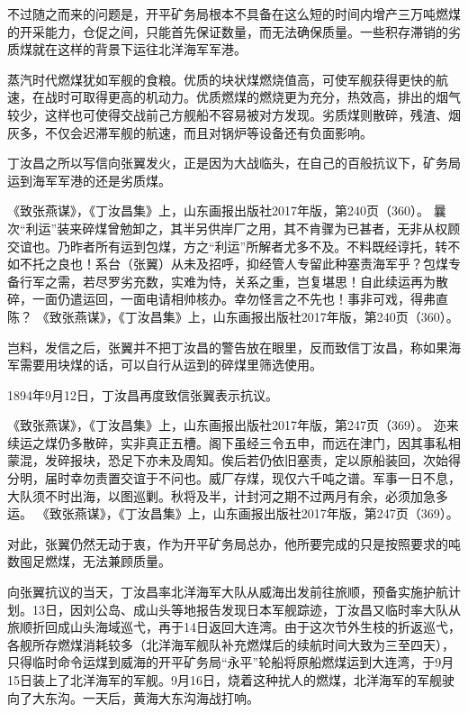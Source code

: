 \documentclass[12pt,UTF8]{ctexbook}
\begin{document}
不过随之而来的问题是，开平矿务局根本不具备在这么短的时间内增产三万吨燃煤的开采能力，仓促之间，只能首先保证数量，而无法确保质量。一些积存滞销的劣质煤就在这样的背景下运往北洋海军军港。

蒸汽时代燃煤犹如军舰的食粮。优质的块状煤燃烧值高，可使军舰获得更快的航速，在战时可取得更高的机动力。优质燃煤的燃烧更为充分，热效高，排出的烟气较少，这样也可使得交战前己方舰船不容易被对方发现。劣质煤则散碎，残渣、烟灰多，不仅会迟滞军舰的航速，而且对锅炉等设备还有负面影响。

丁汝昌之所以写信向张翼发火，正是因为大战临头，在自己的百般抗议下，矿务局运到海军军港的还是劣质煤。

《致张燕谋》，《丁汝昌集》上，山东画报出版社2017年版，第240页（360）。
曩次“利运”装来碎煤曾勉卸之，其半另供岸厂之用，其不肯骤为已甚者，无非从权顾交谊也。乃昨者所有运到包煤，方之“利运”所解者尤多不及。不料既经谆托，转不如不托之良也！系台（张翼）从未及招呼，抑经管人专留此种塞责海军乎？包煤专备行军之需，若尽罗劣充数，实难为恃，关系之重，岂复堪思！自此续运再为散碎，一面仍遣运回，一面电请相帅核办。幸勿怪言之不先也！事非可戏，得弗直陈？ 《致张燕谋》，《丁汝昌集》上，山东画报出版社2017年版，第240页（360）。

岂料，发信之后，张翼并不把丁汝昌的警告放在眼里，反而致信丁汝昌，称如果海军需要用块煤的话，可以自行从运到的碎煤里筛选使用。

1894年9月12日，丁汝昌再度致信张翼表示抗议。

《致张燕谋》，《丁汝昌集》上，山东画报出版社2017年版，第247页（369）。
迩来续运之煤仍多散碎，实非真正五槽。阁下虽经三令五申，而远在津门，因其事私相蒙混，发碎报块，恐足下亦未及周知。俟后若仍依旧塞责，定以原船装回，次始得分明，届时幸勿责置交谊于不问也。威厂存煤，现仅六千吨之谱。军事一日不息，大队须不时出海，以图巡剿。秋将及半，计封河之期不过两月有余，必须加急多运。 《致张燕谋》，《丁汝昌集》上，山东画报出版社2017年版，第247页（369）。

对此，张翼仍然无动于衷，作为开平矿务局总办，他所要完成的只是按照要求的吨数囤足燃煤，无法兼顾质量。

向张翼抗议的当天，丁汝昌率北洋海军大队从威海出发前往旅顺，预备实施护航计划。13日，因刘公岛、成山头等地报告发现日本军舰踪迹，丁汝昌又临时率大队从旅顺折回成山头海域巡弋，再于14日返回大连湾。由于这次节外生枝的折返巡弋，各舰所存燃煤消耗较多（北洋海军舰队补充燃煤后的续航时间大致为三至四天），只得临时命令运煤到威海的开平矿务局“永平”轮船将原船燃煤运到大连湾，于9月15日装上了北洋海军的军舰。9月16日，烧着这种扰人的燃煤，北洋海军的军舰驶向了大东沟。一天后，黄海大东沟海战打响。
\end{document}
